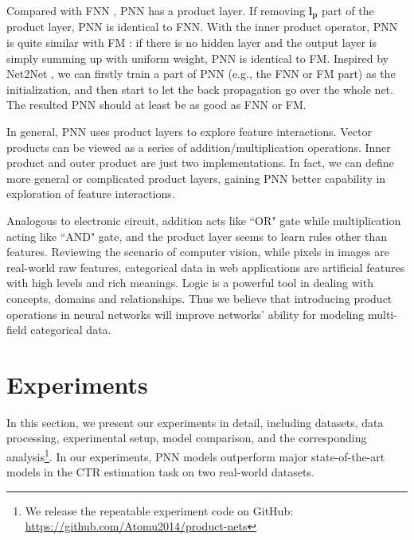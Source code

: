 \documentclass[conference]{IEEEtran}
\newcommand{\bs}{\boldsymbol}
\newcommand{\bl}{\bs{l}}
\newcommand{\bp}{\bs{p}}
\begin{document}


Compared with FNN \cite{zhang2016deep}, PNN has a product layer. If removing $\bl_{\bp}$ part of the product layer, PNN is identical to FNN. With the inner product operator, PNN is quite similar with FM \cite{rendle2010factorization}: if there is no hidden layer and the output layer is simply summing up with uniform weight, PNN is identical to FM. Inspired by Net2Net \cite{chen2015net2net}, we can firstly train a part of PNN (e.g., the FNN or FM part) as the initialization, and then start to let the back propagation go over the whole net. The resulted PNN should at least be as good as FNN or FM.

In general, PNN uses product layers to explore feature interactions. Vector products can be viewed as a series of addition/multiplication operations. Inner product and outer product are just two implementations. In fact, we can define more general or complicated product layers, gaining PNN better capability in exploration of feature interactions.

Analogous to electronic circuit, addition acts like ``OR" gate while multiplication acting like ``AND" gate, and the product layer seems to learn rules other than features. Reviewing the scenario of computer vision, while pixels in images are real-world raw features, categorical data in web applications are artificial features with high levels and rich meanings. Logic is a powerful tool in dealing with concepts, domains and relationships. Thus we believe that introducing product operations in neural networks will improve networks' ability for modeling multi-field categorical data.


\section{Experiments}\label{sec:experiment}
In this section, we present our experiments in detail, including datasets, data processing, experimental setup, model comparison, and the corresponding analysis\footnote{We release the repeatable experiment code on GitHub: \url{https://github.com/Atomu2014/product-nets}}. In our experiments, PNN models outperform major state-of-the-art models in the CTR estimation task on two real-world datasets.
\end{document}
